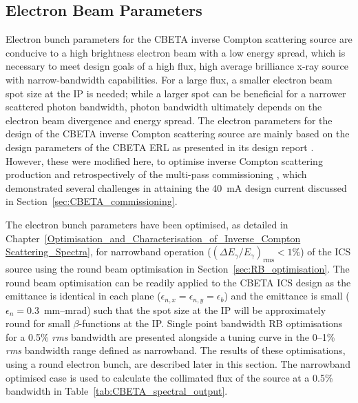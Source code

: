 \documentclass[../main.tex]{subfiles}
\begin{document}
\subsection{Electron Beam Parameters}
\label{sec:CBETA_ICS_electron_parameters}

Electron bunch parameters for the CBETA inverse Compton scattering source are conducive to a high brightness electron beam with a low energy spread, which is necessary to meet design goals of a high flux, high average brilliance x-ray source with narrow-bandwidth capabilities. For a large flux, a smaller electron beam spot size at the IP is needed; while a larger spot can be beneficial for a narrower scattered photon bandwidth, photon bandwidth ultimately depends on the electron beam divergence and energy spread. The electron parameters for the design of the CBETA inverse Compton scattering source are mainly based on the design parameters of the CBETA ERL as presented in its design report \cite{hoffstaetter2017cbeta}. However, these were modified here, to optimise inverse Compton scattering production and retrospectively of the multi-pass commissioning \cite{bartnik2020cbeta}, which demonstrated several challenges in attaining the 40~\si{\milli\ampere} design current discussed in Section~\ref{sec:CBETA_commissioning}. 

The electron bunch parameters have been optimised, as detailed in Chapter~\ref{Optimisation_and_Characterisation_of_Inverse_Compton Scattering_Spectra}, for narrowband operation ($\left(\Delta E_{\gamma}/E_{\gamma}\right)_{\mathrm{rms}} < 1\%$) of the ICS source using the round beam optimisation in Section~\ref{sec:RB_optimisation}. The round beam optimisation can be readily applied to the CBETA ICS design as the emittance is identical in each plane ($\epsilon_{n,x}=\epsilon_{n,y}=\epsilon_{b}$) and the emittance is small ($\epsilon_{n}=0.3$~\si{\milli\meter}--\si{\milli\radian}) such that the spot size at the IP will be approximately round for small $\beta$-functions at the IP. Single point bandwidth RB optimisations for a 0.5\% \textit{rms} bandwidth are presented alongside a tuning curve in the 0--1\% \textit{rms} bandwidth range defined as narrowband. The results of these optimisations, using a round electron bunch, are described later in this section. The narrowband optimised case is used to calculate the collimated flux of the source at a 0.5\% bandwidth in Table~\ref{tab:CBETA_spectral_output}.
\end{document}
